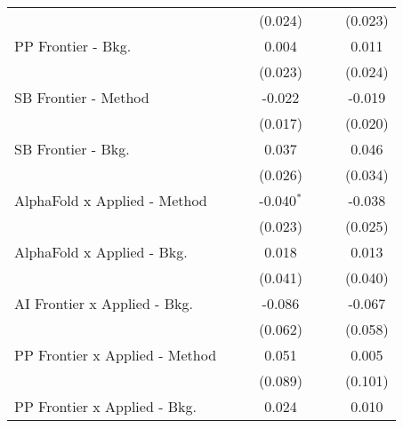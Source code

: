 \begin{tabular}{lcccccc}
                                  &             &                & (0.024)      &             &              & (0.023)\\   
   PP Frontier - Bkg.             &             &                & 0.004        &             &              & 0.011\\   
                                  &             &                & (0.023)      &             &              & (0.024)\\   
   SB Frontier - Method           &             &                & -0.022       &             &              & -0.019\\   
                                  &             &                & (0.017)      &             &              & (0.020)\\   
   SB Frontier - Bkg.             &             &                & 0.037        &             &              & 0.046\\   
                                  &             &                & (0.026)      &             &              & (0.034)\\   
   AlphaFold x Applied - Method   &             &                & -0.040$^{*}$ &             &              & -0.038\\   
                                  &             &                & (0.023)      &             &              & (0.025)\\   
   AlphaFold x Applied - Bkg.     &             &                & 0.018        &             &              & 0.013\\   
                                  &             &                & (0.041)      &             &              & (0.040)\\   
   AI Frontier x Applied - Bkg.   &             &                & -0.086       &             &              & -0.067\\   
                                  &             &                & (0.062)      &             &              & (0.058)\\   
   PP Frontier x Applied - Method &             &                & 0.051        &             &              & 0.005\\   
                                  &             &                & (0.089)      &             &              & (0.101)\\   
   PP Frontier x Applied - Bkg.   &             &                & 0.024        &             &              & 0.010\\   

\end{tabular}

